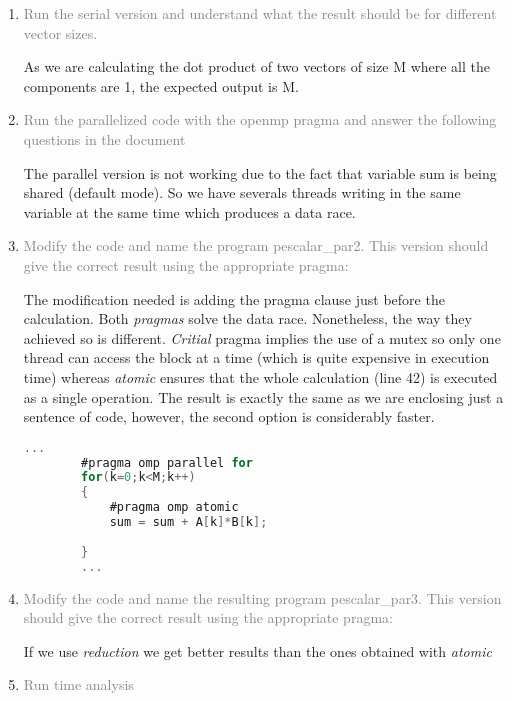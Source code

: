 \documentclass{article}
\begin{document}
\begin{enumerate}

    \item \textcolor{gray}{ Run the serial version and understand what the result should be for different vector sizes.} 
    
    As we are calculating the dot product of two vectors of size M where all the components are 1, the expected output is M.
    
    \item \textcolor{gray}{Run the parallelized code with the openmp pragma and answer the following questions in the document}
    
    The parallel version is not working due to the fact that variable sum is being shared (default mode). So we have severals threads writing in the same variable at the same time which produces a data race.

    \item \textcolor{gray}{Modify the code and name the program pescalar\_par2. This version should give the correct result 
    using the appropriate pragma:}

    The modification needed is adding the pragma clause just before the calculation.
    Both \emph{pragmas} solve the data race. Nonetheless, the way they achieved so is different. \emph{Critial} pragma implies the use of a mutex so only one thread can access the block at a time (which is quite expensive in execution time) whereas \emph{atomic} ensures that the whole calculation (line 42) is executed as a single operation. The result is exactly the same as we are enclosing just a sentence of code, however, the second option is considerably faster.

    \begin{lstlisting}[language=C, texcl=true]
        ...
        #pragma omp parallel for 
        for(k=0;k<M;k++)
        {	
            #pragma omp atomic
            sum = sum + A[k]*B[k];
    
        } 
        ...
    \end{lstlisting}

    \item \textcolor{gray}{Modify the code and name the resulting program pescalar\_par3. This version should give the correct 
    result using the appropriate pragma: }

    If we use \emph{reduction} we get better results than the ones obtained with \emph{atomic}

    \item \textcolor{gray}{Run time analysis}

\end{enumerate}
\end{document}
